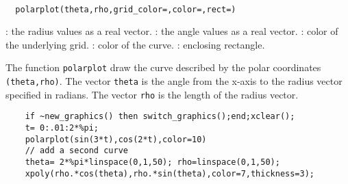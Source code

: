 
\begin{mandesc}
  \\
\end{mandesc}
\begin{calling_sequence}
\begin{verbatim}
  polarplot(theta,rho,grid_color=,color=,rect=)
\end{verbatim}
\end{calling_sequence}

\begin{parameters}
  \begin{varlist}
    : the radius values as a real vector.
    : the angle values as a real vector.
    : color of the underlying grid.
    : color of the curve.
    : enclosing rectangle.
  \end{varlist}
\end{parameters}

\begin{mandescription}
  The function \verb!polarplot! draw the curve described by the polar coordinates \verb!(theta,rho)!.
  The vector \verb!theta! is the angle from the x-axis to the radius vector specified in radians.
  The vector \verb!rho! is the length of the radius vector.
\end{mandescription}

\begin{examples}
  \begin{Verbatim}
    if ~new_graphics() then switch_graphics();end;xclear();
    t= 0:.01:2*%pi;
    polarplot(sin(3*t),cos(2*t),color=10)
    // add a second curve
    theta= 2*%pi*linspace(0,1,50); rho=linspace(0,1,50);
    xpoly(rho.*cos(theta),rho.*sin(theta),color=7,thickness=3);
  \end{Verbatim}
\end{examples}
